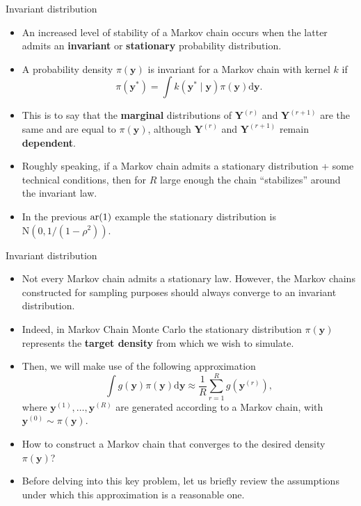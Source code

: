 \documentclass[
  9pt,
  ignorenonframetext,
]{beamer}
\begin{document}
\begin{frame}{Invariant distribution}
\protect\hypertarget{invariant-distribution}{}
\begin{itemize}
\item
  An increased level of stability of a Markov chain occurs when the
  latter admits an \textbf{invariant} or \textbf{stationary} probability
  distribution.
\item
  A probability density \(\pi(\bm{y})\) is invariant for a Markov chain
  with kernel \(k\) if \[
  \pi(\bm{y}^*) = \int k(\bm{y}^* \mid \bm{y})\pi(\bm{y})\mathrm{d}\bm{y}.
  \]
\item
  This is to say that the \textbf{marginal} distributions of
  \(\bm{Y}^{(r)}\) and \(\bm{Y}^{(r + 1)}\) are the same and are equal
  to \(\pi(\bm{y})\), although \(\bm{Y}^{(r)}\) and \(\bm{Y}^{(r + 1)}\)
  remain \textbf{dependent}.
\item
  Roughly speaking, if a Markov chain admits a stationary distribution +
  some technical conditions, then for \(R\) large enough the chain
  ``stabilizes'' around the invariant law.
\item
  In the previous \(\textup{ar}(1)\) example the stationary distribution
  is \(\text{N}(0, 1 / (1 - \rho^2))\).
\end{itemize}
\end{frame}

\begin{frame}{Invariant distribution}
\protect\hypertarget{invariant-distribution-1}{}
\begin{itemize}
\item
  Not every Markov chain admits a stationary law. However, the Markov
  chains constructed for sampling purposes should always converge to an
  invariant distribution.
\item
  Indeed, in Markov Chain Monte Carlo the stationary distribution
  \(\pi(\bm{y})\) represents the \textbf{target density} from which we
  wish to simulate.
\item
  Then, we will make use of the following approximation \[
  \int g(\bm{y}) \pi(\bm{y})\mathrm{d}\bm{y} \approx \frac{1}{R}\sum_{r=1}^R g(\bm{y}^{(r)}),
  \] where \(\bm{y}^{(1)}, \dots, \bm{y}^{(R)}\) are generated according
  to a Markov chain, with \(\bm{y}^{(0)} \sim \pi(\bm{y})\).
\item
  How to construct a Markov chain that converges to the desired density
  \(\pi(\bm{y})\)?
\item
  Before delving into this key problem, let us briefly review the
  assumptions under which this approximation is a reasonable one.
\end{itemize}
\end{frame}
\end{document}
